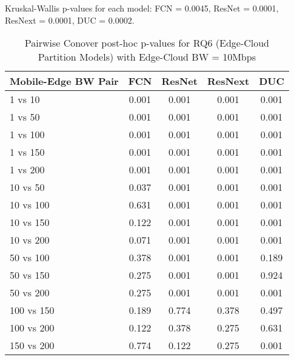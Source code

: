\begin{table}[h]
\centering
\caption{Pairwise Conover post-hoc p-values for RQ6 (Edge-Cloud Partition Models) with Edge-Cloud BW = 10Mbps}
\label{tab:conover_edge_cloud_partition_ec10}
\smallskip
Kruskal-Wallis p-values for each model: FCN = 0.0045, ResNet = 0.0001, ResNext = 0.0001, DUC = 0.0002.

\begin{tabular}{lcccc}
\toprule
Mobile-Edge BW Pair & FCN & ResNet & ResNext & DUC \\
\midrule
1 vs 10 & 0.001 & 0.001 & 0.001 & 0.001 \\
1 vs 50 & 0.001 & 0.001 & 0.001 & 0.001 \\
1 vs 100 & 0.001 & 0.001 & 0.001 & 0.001 \\
1 vs 150 & 0.001 & 0.001 & 0.001 & 0.001 \\
1 vs 200 & 0.001 & 0.001 & 0.001 & 0.001 \\
10 vs 50 & 0.037 & 0.001 & 0.001 & 0.001 \\
10 vs 100 & 0.631 & 0.001 & 0.001 & 0.001 \\
10 vs 150 & 0.122 & 0.001 & 0.001 & 0.001 \\
10 vs 200 & 0.071 & 0.001 & 0.001 & 0.001 \\
50 vs 100 & 0.378 & 0.001 & 0.001 & 0.189 \\
50 vs 150 & 0.275 & 0.001 & 0.001 & 0.924 \\
50 vs 200 & 0.275 & 0.001 & 0.001 & 0.001 \\
100 vs 150 & 0.189 & 0.774 & 0.378 & 0.497 \\
100 vs 200 & 0.122 & 0.378 & 0.275 & 0.631 \\
150 vs 200 & 0.774 & 0.122 & 0.275 & 0.001 \\
\bottomrule
\end{tabular}
\end{table}

